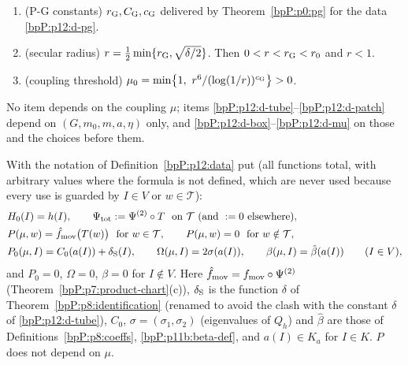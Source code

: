 \begin{definition}
\begin{enumerate}[label=(D\arabic*)]
\item\label{bpP:p12:d-G} (P-G constants) $r_{\rm G},C_{\rm G},c_{\rm G}$ delivered by Theorem~\ref{bpP:p0:pg} for the data \ref{bpP:p12:d-pg}.
\item\label{bpP:p12:d-r} (secular radius) $r=\tfrac12\min\{r_{\rm G},\sqrt{\delta/2}\}$. Then $0<r<r_{\rm G}<r_0$ and $r<1$.
\item\label{bpP:p12:d-mu} (coupling threshold) $\mu_0=\min\bigl\{1,\ r^6/(\log(1/r))^{c_{\rm G}}\bigr\}>0$.
\end{enumerate}
No item depends on the coupling $\mu$; items \ref{bpP:p12:d-tube}--\ref{bpP:p12:d-patch} depend on $(G,m_0,m,a,\eta)$ only, and \ref{bpP:p12:d-box}--\ref{bpP:p12:d-mu} on those and the choices before them.
\end{definition}

\begin{definition}\label{bpP:p12:perturbation}
With the notation of Definition~\ref{bpP:p12:data} put (all functions total, with arbitrary values where the formula is not defined, which are never used because every use is guarded by $I\in V$ or $w\in\mathcal T$):
\begin{align*}
&H_0(I)=h(I),\qquad \Psi_{\rm tot}:=\Psi^{(2)}\circ T\ \text{ on }\mathcal T\ (\text{and }:=0\text{ elsewhere}),\\
&P(\mu,w)=\hat f_{\rm mov}\bigl(T(w)\bigr)\ \text{ for }w\in\mathcal T,\qquad P(\mu,w)=0\ \text{ for }w\notin\mathcal T,\\
&P_0(\mu,I)=C_0(a(I))+\delta_{\rm S}(I),\qquad \Omega(\mu,I)=2\sigma(a(I)),\qquad\beta(\mu,I)=\hat\beta(a(I))\qquad(I\in V),
\end{align*}
and $P_0=0$, $\Omega=0$, $\beta=0$ for $I\notin V$. Here $\hat f_{\rm mov}=f_{\rm mov}\circ\Psi^{(2)}$ (Theorem~\ref{bpP:p7:product-chart}(c)), $\delta_{\rm S}$ is the function $\delta$ of Theorem~\ref{bpP:p8:identification} (renamed to avoid the clash with the constant $\delta$ of \ref{bpP:p12:d-tube}), $C_0$, $\sigma=(\sigma_1,\sigma_2)$ (eigenvalues of $Q_h$) and $\hat\beta$ are those of Definitions~\ref{bpP:p8:coeffs}, \ref{bpP:p11b:beta-def}, and $a(I)\in K_a$ for $I\in K$. $P$ does not depend on $\mu$.
\end{definition}

